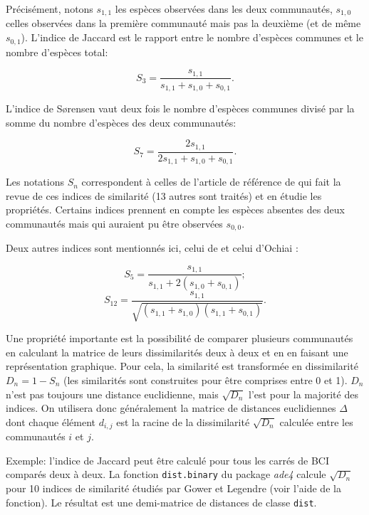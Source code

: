 \documentclass[
  11pt,
  french,
  a4paper,
  extrafontsizes,onecolumn,openright
  ]{memoir}
\begin{document}
Précisément, notons \(s_{1,1}\) les espèces observées dans les deux communautés, \(s_{1,0}\) celles observées dans la première communauté mais pas la deuxième (et de même \(s_{0,1}\)).
L'indice de Jaccard est le rapport entre le nombre d'espèces communes et le nombre d'espèces total:

\begin{equation}
  \label{eq:Jaccard}
  S_3 = \frac{s_{1,1}}{s_{1,1}+s_{1,0}+s_{0,1}}.
\end{equation}

L'indice de Sørensen vaut deux fois le nombre d'espèces communes divisé par la somme du nombre d'espèces des deux communautés:

\begin{equation}
  \label{eq:S7}
  S_7 = \frac{2s_{1,1}}{2s_{1,1}+s_{1,0}+s_{0,1}}.
\end{equation}

Les notations \(S_n\) correspondent à celles de l'article de référence de \textcite{Gower1986} qui fait la revue de ces indices de similarité (13 autres sont traités) et en étudie les propriétés.
Certains indices prennent en compte les espèces absentes des deux communautés mais qui auraient pu être observées \(s_{0,0}\).

Deux autres indices sont mentionnés ici, celui de \textcite{Sokal1963} et celui d'Ochiai \autocite*{Ochiai1957}:

\begin{equation}
  \label{eq:S5}
  S_5 = \frac{s_{1,1}}{s_{1,1}+2 \left(s_{1,0}+s_{0,1}\right)};
\end{equation}
\begin{equation}
  \label{eq:S12}
  S_{12} = \frac{s_{1,1}}{\sqrt{\left(s_{1,1}+s_{1,0}\right)\left(s_{1,1}+s_{0,1}\right)}}.
\end{equation}

Une propriété importante est la possibilité de comparer plusieurs communautés en calculant la matrice de leurs dissimilarités deux à deux et en en faisant une représentation graphique.
Pour cela, la similarité est transformée en dissimilarité \(D_n=1-S_n\) (les similarités sont construites pour être comprises entre 0 et 1).
\(D_n\) n'est pas toujours une distance euclidienne, mais \(\sqrt{D_n}\) l'est pour la majorité des indices.
On utilisera donc généralement la matrice de distances euclidiennes \(\Delta\) dont chaque élément \(d_{i,j}\) est la racine de la dissimilarité \(\sqrt{D_n}\) calculée entre les communautés \(i\) et \(j\).

Exemple: l'indice de Jaccard peut être calculé pour tous les carrés de BCI comparés deux à deux.
La fonction \texttt{dist.binary} du package \emph{ade4} calcule \(\sqrt{D_n}\) pour 10 indices de similarité étudiés par Gower et Legendre (voir l'aide de la fonction).
Le résultat est une demi-matrice de distances de classe \texttt{dist}.
\end{document}
